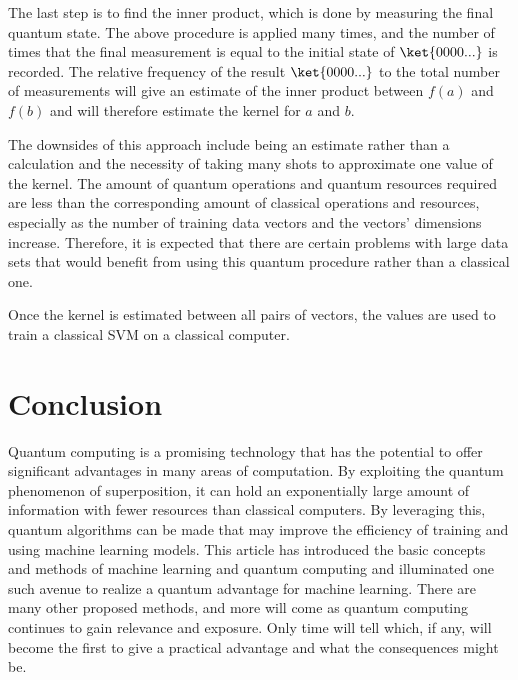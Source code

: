 \documentclass[%
 reprint,
nofootinbib,
 amsmath,amssymb,
 aps,
]{revtex4-2}
\begin{document}
The last step is to find the inner product, which is done by measuring the final quantum state. The above procedure is applied many times, and the number of times that the final measurement is equal to the initial state of $\ket{0000...}$ is recorded. The relative frequency of the result $\ket{0000...}$ to the total number of measurements will give an estimate of the inner product between $f(a)$ and $f(b)$ and will therefore estimate the kernel for $a$ and $b$.

The downsides of this approach include being an estimate rather than a calculation and the necessity of taking many shots to approximate one value of the kernel. The amount of quantum operations and quantum resources required are less than the corresponding amount of classical operations and resources, especially as the number of training data vectors and the vectors' dimensions increase. Therefore, it is expected that there are certain problems with large data sets that would benefit from using this quantum procedure rather than a classical one.

Once the kernel is estimated between all pairs of vectors, the values are used to train a classical SVM on a classical computer.

\section{Conclusion}

Quantum computing is a promising technology that has the potential to offer significant advantages in many areas of computation. By exploiting the quantum phenomenon of superposition, it can hold an exponentially large amount of information with fewer resources than classical computers. By leveraging this, quantum algorithms can be made that may improve the efficiency of training and using machine learning models. This article has introduced the basic concepts and methods of machine learning and quantum computing and illuminated one such avenue to realize a quantum advantage for machine learning. There are many other proposed methods, and more will come as quantum computing continues to gain relevance and exposure. Only time will tell which, if any, will become the first to give a practical advantage and what the consequences might be.


\printendnotes







\appendix
\raggedbottom\sloppy
\end{document}
